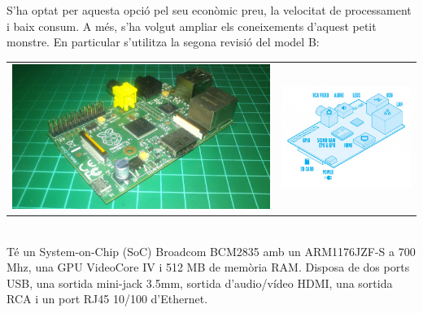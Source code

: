 \documentclass[twoside]{article}
\begin{document}
S'ha optat per aquesta opció pel seu econòmic preu, la velocitat de processament i baix consum. A més, s'ha volgut ampliar els coneixements d'aquest petit monstre. En particular s'utilitza la segona revisió del model B:
 
\begin{tabular}{cc}
\hspace{1cm}\includegraphics[scale=0.06]{RPi.jpg} & \hspace{0.5cm} \includegraphics[scale=0.3]{RPi2.jpg}
\end{tabular} \\

Té un System-on-Chip (SoC) Broadcom BCM2835 amb un ARM1176JZF-S a 700 Mhz, una GPU VideoCore IV i 512 MB de memòria RAM. Disposa de dos ports USB, una sortida mini-jack 3.5mm, sortida d'audio/vídeo HDMI, una sortida RCA i un port RJ45 10/100 d'Ethernet. 
\end{document}
